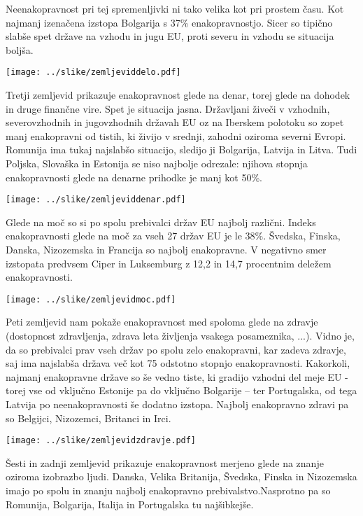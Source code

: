 \documentclass[11pt,a4paper]{article}
\begin{document}
Neenakopravnost pri tej spremenljivki ni tako velika kot pri prostem času. Kot najmanj izenačena izstopa Bolgarija s 37\% enakopravnostjo. Sicer so tipično slabše spet države na vzhodu in jugu EU, proti severu in vzhodu se situacija boljša.

\texttt{[image: ../slike/zemljeviddelo.pdf]}

\newpage

Tretji zemljevid prikazuje enakopravnost glede na denar, torej glede na dohodek in druge finančne vire. Spet je situacija jasna. Državljani živeči v vzhodnih, severovzhodnih in jugovzhodnih državah EU oz na Iberskem polotoku so zopet manj enakopravni od tistih, ki živijo v srednji, zahodni oziroma severni Evropi. Romunija ima tukaj najslabšo situacijo, sledijo ji Bolgarija, Latvija in Litva. Tudi Poljska, Slovaška in Estonija se niso najbolje odrezale: njihova stopnja enakopravnosti glede na denarne prihodke je manj kot 50\%.

\texttt{[image: ../slike/zemljeviddenar.pdf]}

\newpage

Glede na moč so si po spolu prebivalci držav EU najbolj različni. Indeks enakopravnosti glede na moč za vseh 27 držav EU je le 38\%. Švedska, Finska, Danska, Nizozemska in Francija so najbolj enakopravne. V negativno smer izstopata predvsem Ciper in Luksemburg z 12,2 in 14,7 procentnim deležem enakopravnosti.

\texttt{[image: ../slike/zemljevidmoc.pdf]}

\newpage

Peti zemljevid nam pokaže enakopravnost med spoloma glede na zdravje (dostopnost zdravljenja, zdrava leta življenja vsakega posameznika, ...). Vidno je, da so prebivalci prav vseh držav po spolu zelo enakopravni, kar zadeva zdravje, saj ima najslabša država več kot 75 odstotno stopnjo enakopravnosti. Kakorkoli, najmanj enakopravne države so še vedno tiste, ki gradijo vzhodni del meje EU - torej vse od vključno Estonije pa do vključno Bolgarije -- ter Portugalska, od tega Latvija po neenakopravnosti še dodatno izstopa. Najbolj enakopravno zdravi pa so Belgijci, Nizozemci, Britanci in Irci.

\texttt{[image: ../slike/zemljevidzdravje.pdf]}

\newpage

Šesti in zadnji zemljevid prikazuje enakopravnost merjeno glede na znanje oziroma izobrazbo ljudi. Danska, Velika Britanija, Švedska, Finska in Nizozemska imajo po spolu in znanju najbolj enakopravno prebivalstvo.Nasprotno pa so Romunija, Bolgarija, Italija in Portugalska tu najšibkejše.
\end{document}

